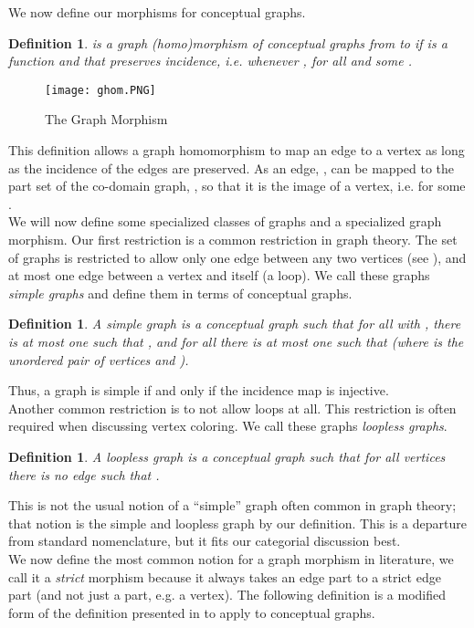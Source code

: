 \documentclass[11pt]{article}
\newtheorem{definition}[theorem]{Definition}
\begin{document}
\indent We now define our morphisms for conceptual graphs.
\begin{definition}
 is a \emph{graph (homo)morphism} of conceptual graphs from  to  if  is a function  and  that preserves incidence, i.e. \textunderscore whenever \textunderscore, for all  and some .
\end{definition}
\begin{figure}[h]
\centering \texttt{[image: ghom.PNG]}
\caption{The Graph Morphism}
\end{figure}
\indent This definition allows a graph homomorphism to map an edge to a vertex as long as the incidence of the edges are preserved. As an edge, , can be mapped to the part set of the co-domain graph, , so that it is the image of a vertex, i.e.  for some .\\
\indent We will now define some specialized classes of graphs and a specialized graph morphism. Our first restriction is a common restriction in graph theory. The set of graphs is restricted to allow only one edge between any two vertices (see \cite{HN2004}), and at most one edge between a vertex and itself (a loop). We call these graphs \textit{simple graphs} and define them in terms of conceptual graphs.
\begin{definition}
A \emph{simple} graph  is a conceptual graph such that for all  with , there is at most one  such that \textunderscore, and for all  there is at most one  such that \textunderscore (where \textunderscore is the unordered pair of vertices  and ).
\end{definition}
Thus, a graph is simple if and only if the incidence map is injective.\\
\indent Another common restriction is to not allow loops at all. This restriction is often required when discussing vertex coloring. We call these graphs \textit{loopless graphs}.
\begin{definition}
A \emph{loopless} graph  is a conceptual graph such that for all vertices  there is no edge  such that \textunderscore.
\end{definition}
\indent This is not the usual notion of a ``simple'' graph often common in graph theory; that notion is the simple and loopless graph by our definition. This is a departure from standard nomenclature, but it fits our categorial discussion best.\\
\indent We now define the most common notion for a graph morphism in literature, we call it a \emph{strict} morphism because it always takes an edge part to a strict edge part (and not just a part, e.g. a vertex). The following definition is a modified form of the definition presented in \cite{HN2004} to apply to conceptual graphs.
\end{document}

